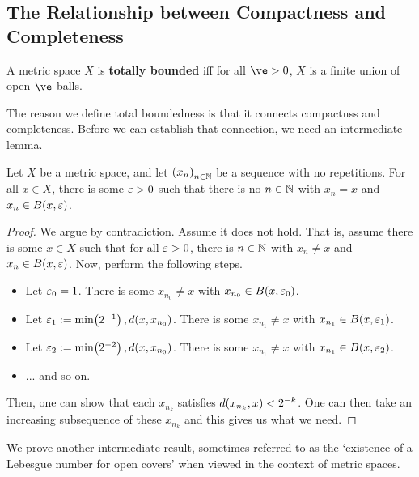 \subsection{The Relationship between Compactness and Completeness}

\begin{boxdefinition}
    A metric space $X$ is \textbf{totally bounded} iff for all $\ve>0$, $X$ is a finite union of open $\ve$-balls.
\end{boxdefinition}

The reason we define total boundedness is that it connects compactnss and completeness. Before we can establish that connection, we need an intermediate lemma.

\begin{boxlemma}\label{Ch1:Lemma:Intermediate_compact_seq_compact_TFAE}
    Let $X$ be a metric space, and let $\left( x_n \right)_{n \in \mathbb{N}}$ be a sequence with no repetitions. For all $x \in X$, there is some $\varepsilon > 0$ such that there is no $n \in \mathbb{N}$ with $x_n = x$ and $x_n \in B\!\left( x, \varepsilon \right)$.
\end{boxlemma}
\begin{proof}
    We argue by contradiction. Assume it does not hold. That is, assume there is some $x \in X$ such that for all $\varepsilon > 0$, there is $n \in \mathbb{N}$ with $x_n \neq x$ and $x_n \in B\!\left( x, \varepsilon \right)$. Now, perform the following steps.
    \begin{itemize}
        \item Let $\varepsilon_0 = 1$. There is some $x_{n_0} \neq x$ with $x_{n_0} \in B\!\left( x, \varepsilon_0 \right)$.
        \item Let $\varepsilon_1 := \min\!\left( 2^{-1} \right), d\!\left( x, x_{n_0} \right)$. There is some $x_{n_1} \neq x$ with $x_{n_1} \in B\!\left( x, \varepsilon_1 \right)$.
        \item Let $\varepsilon_2 := \min\!\left( 2^{-2} \right), d\!\left( x, x_{n_0} \right)$. There is some $x_{n_1} \neq x$ with $x_{n_1} \in B\!\left( x, \varepsilon_2 \right)$.
        \item ... and so on.
    \end{itemize}
    
    Then, one can show that each $x_{n_k}$ satisfies $d\!\left( x_{n_k}, x \right) < 2^{-k}$. One can then take an increasing subsequence of these $x_{n_k}$ and this gives us what we need.
\end{proof}

We prove another intermediate result, sometimes referred to as the `existence of a Lebesgue number for open covers' when viewed in the context of metric spaces. %

